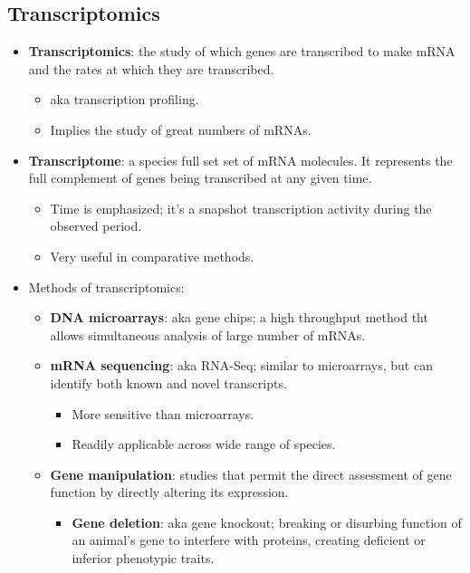 \documentclass[12pt,a4paper]{article}
\begin{document}
\subsection{Transcriptomics}
\begin{itemize}
    \item \textbf{Transcriptomics}: the study of which genes are transcribed to make mRNA and the rates at which they are transcribed.
        \begin{itemize}
            \item aka transcription profiling.
            \item Implies the 
            study of great numbers of mRNAs.
        \end{itemize}
    \item \textbf{Transcriptome}: a species full set set of mRNA molecules. It represents the full complement of genes being transcribed at any given time.
        \begin{itemize}
            \item Time is emphasized; it's a snapshot transcription activity during the observed period.
            \item Very useful in comparative methods.
        \end{itemize}
    \item Methods of transcriptomics:
        \begin{itemize}
            \item \textbf{DNA microarrays}: aka gene chips; a high throughput method tht allows simultaneous analysis of large number of mRNAs.
            \item \textbf{mRNA sequencing}: aka RNA-Seq; similar to microarrays, but can identify both known and {\color{o-Sun}novel} transcripts.
                \begin{itemize}
                    \item More sensitive than microarrays.
                    \item Readily applicable across wide range of species.
                \end{itemize}
            \item \textbf{Gene manipulation}: studies that permit the direct assessment of gene function by directly altering its expression.
                \begin{itemize}
                    \item \textbf{Gene deletion}: aka gene knockout; breaking or disurbing function of an animal's gene to interfere with proteins, creating deficient or inferior phenotypic traits.

\end{itemize}
\end{itemize}
\end{itemize}
\end{document}

